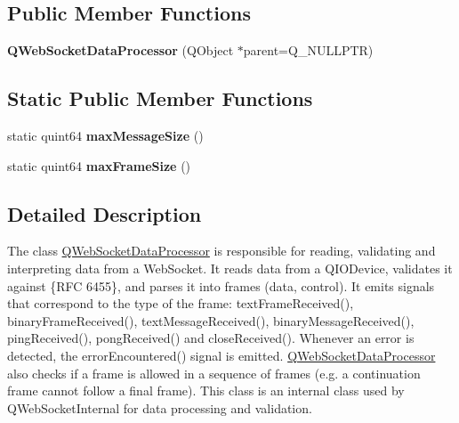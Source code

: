 \subsection*{Public Member Functions}
\begin{DoxyCompactItemize}
\item 
\mbox{\label{class_q_web_socket_data_processor_af808649fa844cb7bddbecf876d258e0d}} 
{\bfseries Q\+Web\+Socket\+Data\+Processor} (Q\+Object $\ast$parent=Q\+\_\+\+N\+U\+L\+L\+P\+TR)
\end{DoxyCompactItemize}
\subsection*{Static Public Member Functions}
\begin{DoxyCompactItemize}
\item 
\mbox{\label{class_q_web_socket_data_processor_a7669d4119d6cd01d06111de2b20663ba}} 
static quint64 {\bfseries max\+Message\+Size} ()
\item 
\mbox{\label{class_q_web_socket_data_processor_a843bdb662a38b770d6dadffd28c3ebce}} 
static quint64 {\bfseries max\+Frame\+Size} ()
\end{DoxyCompactItemize}


\subsection{Detailed Description}
The class \mbox{\hyperlink{class_q_web_socket_data_processor}{Q\+Web\+Socket\+Data\+Processor}} is responsible for reading, validating and interpreting data from a Web\+Socket. It reads data from a Q\+I\+O\+Device, validates it against \{R\+FC 6455\}, and parses it into frames (data, control). It emits signals that correspond to the type of the frame\+: text\+Frame\+Received(), binary\+Frame\+Received(), text\+Message\+Received(), binary\+Message\+Received(), ping\+Received(), pong\+Received() and close\+Received(). Whenever an error is detected, the error\+Encountered() signal is emitted. \mbox{\hyperlink{class_q_web_socket_data_processor}{Q\+Web\+Socket\+Data\+Processor}} also checks if a frame is allowed in a sequence of frames (e.\+g. a continuation frame cannot follow a final frame). This class is an internal class used by Q\+Web\+Socket\+Internal for data processing and validation.

